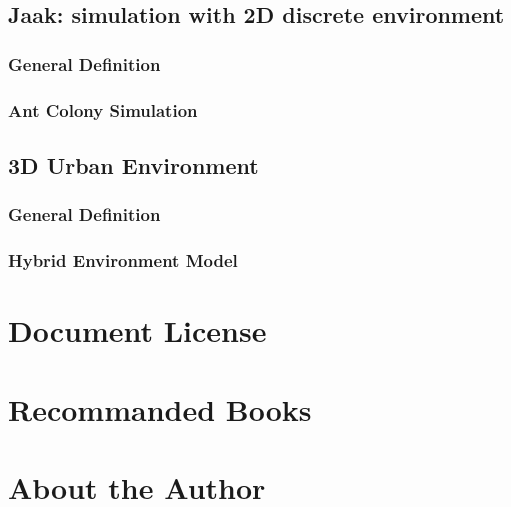 \begin{bibliographysection}
	\subsection[2D Environment]{{Jaak:} simulation with {2D} discrete environment}
	\subsubsection{General Definition}
	
	\subsubsection{Ant Colony Simulation}
	

	\subsection[3D Environment]{{3D} Urban Environment}
	\subsubsection{General Definition}
	
	\subsubsection{Hybrid Environment Model}
	

\end{bibliographysection}

\appendix
\section{Document License}

\section{Recommanded Books}

\section{About the Author}


\endinput
